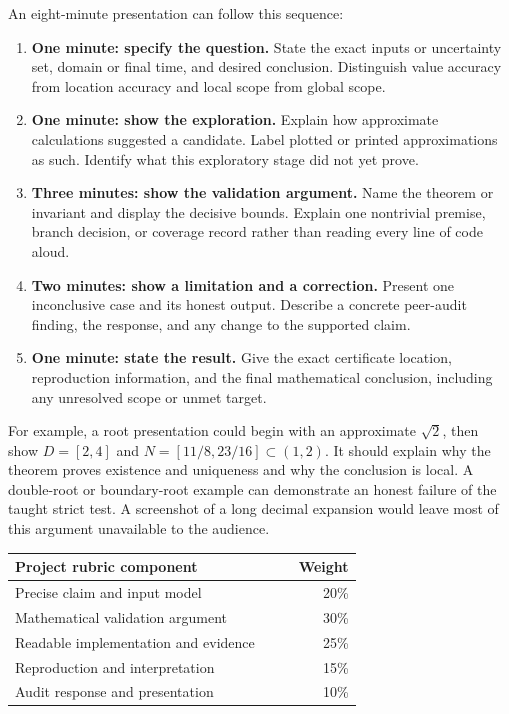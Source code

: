 An eight-minute presentation can follow this sequence:
\begin{enumerate}
\item \textbf{One minute: specify the question.} State the exact inputs
or uncertainty set, domain or final time, and desired conclusion. Distinguish
value accuracy from location accuracy and local scope from global scope.
\item \textbf{One minute: show the exploration.} Explain how approximate
calculations suggested a candidate. Label plotted or printed approximations
as such. Identify what this exploratory stage did not yet prove.
\item \textbf{Three minutes: show the validation argument.} Name the
theorem or invariant and display the decisive bounds. Explain one
nontrivial premise, branch decision, or coverage record rather than reading
every line of code aloud.
\item \textbf{Two minutes: show a limitation and a correction.} Present
one inconclusive case and its honest output. Describe a concrete peer-audit
finding, the response, and any change to the supported claim.
\item \textbf{One minute: state the result.} Give the exact certificate
location, reproduction information, and the final mathematical conclusion,
including any unresolved scope or unmet target.
\end{enumerate}

For example, a root presentation could begin with an approximate $\sqrt2$,
then show $D=[2,4]$ and $N=[11/8,23/16]\subset(1,2)$. It should explain
why the theorem proves existence and uniqueness and why the conclusion is
local. A double-root or boundary-root example can demonstrate an honest
failure of the taught strict test. A screenshot of a long decimal expansion
would leave most of this argument unavailable to the audience.

\begin{center}
\begin{tabular}{p{0.73\linewidth}r}
\toprule
Project rubric component & Weight\\
\midrule
Precise claim and input model & 20\%\\
Mathematical validation argument & 30\%\\
Readable implementation and evidence & 25\%\\
Reproduction and interpretation & 15\%\\
Audit response and presentation & 10\%\\
\bottomrule
\end{tabular}
\end{center}

